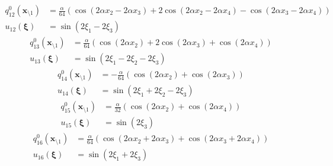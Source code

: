 \documentclass[11pt]{jfm}
\numberwithin{equation}{section}
\begin{document}
\begin{subequations}
\label{A15}
\begin{align}
q_{12}^0(\boldsymbol{x}_{\setminus 1})&=\frac{\alpha}{64}   (\cos (2 \alpha  x_2-2 \alpha  x_3)+2 \cos (2 \alpha  x_2-2 \alpha  x_4)-\cos (2 \alpha  x_3-2 \alpha  x_4))
\label{A15a} \\
u_{12}(\boldsymbol{\xi})&=\sin (2 \xi_1-2 \xi_3)
\label{A15b}
\end{align}\end{subequations}
\vspace{-0.4cm}
\begin{subequations}
\label{A16}
\begin{align}
 q_{13}^0(\boldsymbol{x}_{\setminus 1})&=\frac{\alpha}{64}   (\cos (2 \alpha  x_2)+2 \cos (2 \alpha  x_3)+\cos (2 \alpha  x_4))
\label{A16a} \\
u_{13}(\boldsymbol{\xi})&=\sin (2 \xi_1-2 \xi_2-2 \xi_3)
\label{A16b}
\end{align}\end{subequations}
\vspace{-0.4cm}
\begin{subequations}
\label{A17}
\begin{align}
q_{14}^0(\boldsymbol{x}_{\setminus 1})&=-\frac{\alpha}{64}   (\cos (2 \alpha  x_2)+\cos (2 \alpha  x_3))
\label{A17a} \\
u_{14}(\boldsymbol{\xi})&=\sin (2 \xi_1+2 \xi_2-2 \xi_3)
\label{A17b}
\end{align}\end{subequations}
\vspace{-0.4cm}
\begin{subequations}
\label{A18}
\begin{align}
q_{15}^0(\boldsymbol{x}_{\setminus 1})&=\frac{\alpha}{32}   \left(\cos (2 \alpha  x_2)+\cos (2 \alpha  x_4)\right)
\label{A18a} \\
u_{15}(\boldsymbol{\xi})&=\sin (2 \xi_3)
\label{A18b}
\end{align}\end{subequations}
\vspace{-0.4cm}
\begin{subequations}
\label{A19}
\begin{align}
q_{16}^0(\boldsymbol{x}_{\setminus 1})&=\frac{\alpha}{64}  \left( \cos (2 \alpha x_2 +2 \alpha  x_3)+\cos (2 \alpha  x_3+2 \alpha  x_4)\right)
\label{A19a} \\
u_{16}(\boldsymbol{\xi})&=\sin (2 \xi_1+2 \xi_3)
\label{A19b}
\end{align}\end{subequations}
\end{document}

